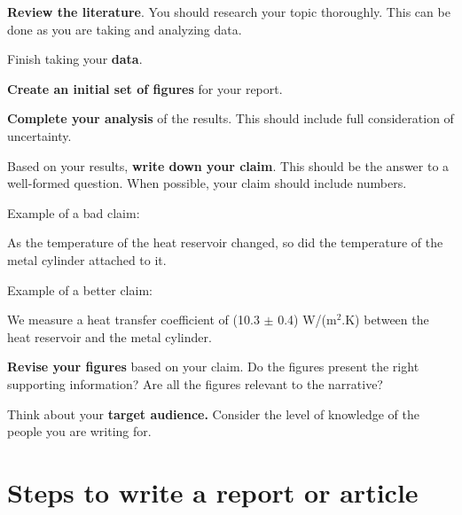 \documentclass[12pt]{article}
\begin{document}
\begin{todolist}

\item {\bf Review the literature}. You should research your topic
  thoroughly.  This can be done as you are taking and analyzing data.

\item Finish taking your {\bf data}.

\item {\bf Create an initial set of figures} for your report.

\item {\bf Complete your analysis} of the results. This should include full
consideration of uncertainty.

\item Based on your results, {\bf write down your claim}. This should
  be the answer to a well-formed question. When possible, your claim
  should include numbers.

\vspace{2mm}

\noindent Example of a bad claim:

\begin{em}
  As the temperature of the heat reservoir changed, so did the temperature of
  the metal cylinder attached to it.
\end{em}

\vspace{2mm}

\noindent Example of a better claim:

\begin{em}
  We measure a heat transfer coefficient of (10.3 $\pm$ 0.4) W/(m$^{2}$.K)
  between the heat reservoir and the metal cylinder.
\end{em}

\item {\bf Revise your figures} based on your claim. Do the figures present the
  right supporting information? Are all the figures relevant to the narrative?

\item Think about your {\bf target audience.} Consider the level of knowledge
of the people you are writing for.

\end{todolist}

\newpage

\section{Steps to write a report or article}
\label{sec:order}
\end{document}
